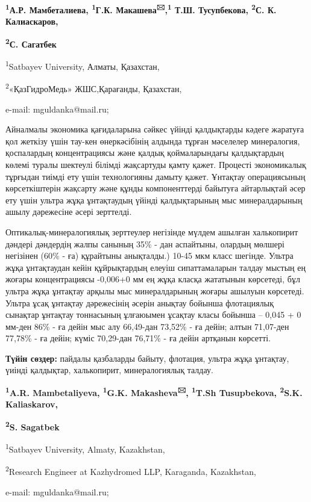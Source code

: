 
\begin{center}
{\bfseries \textsuperscript{1}А.Р. Мамбеталиева, \textsuperscript{1}Г.К.
Макашева\textsuperscript{🖂},\textsuperscript{1} Т.Ш. Тусупбекова,
\textsuperscript{2}С. К. Калиаскаров,}

{\bfseries \textsuperscript{2}С. Сагатбек}

\textsuperscript{1}Satbayev University, Алматы, Қазахстан,

\textsuperscript{2}«ҚазГидроМедь» ЖШС,Қарағанды, Қазахстан,

e-mail: mguldanka@mail.ru;
\end{center}

Айналмалы экономика қағидаларына сәйкес үйінді қалдықтарды кәдеге
жаратуға қол жеткізу үшін тау-кен өнеркәсібінің алдында тұрған мәселелер
минералогия, қоспалардың концентрациясы және қалдық қоймаларындағы
қалдықтардың көлемі туралы шектеулі білімді жақсартуды қамту қажет.
Процесті экономикалық тұрғыдан тиімді ету үшін технологияны дамыту
қажет. Ұнтақтау операциясының көрсеткіштерін жақсарту және құнды
компоненттерді байытуға айтарлықтай әсер ету үшін ультра жұқа
ұнтақтаудың үйінді қалдықтарының мыс минералдарының ашылу дәрежесіне
әсері зерттелді.

Оптикалық-минералогиялық зерттеулер негізінде мүлдем ашылған халькопирит
дәндері дәндердің жалпы санының 35\% - дан аспайтыны, олардың мөлшері
негізінен (60\% - ға) құрайтыны анықталды.) 10-45 мкм класс шегінде.
Ультра жұқа ұнтақтаудан кейін құйрықтардың елеуіш сипаттамаларын талдау
мыстың ең жоғары концентрациясы -0,006+0 мм ең жұқа класқа жататынын
көрсетеді, бұл ультра жұқа ұнтақтау арқылы мыс минералдарының жоғары
ашылуын көрсетеді. Ультра ұсақ ұнтақтау дәрежесінің әсерін анықтау
бойынша флотациялық сынақтар ұнтақтау тоннасының ұлғаюымен ұсақтау класы
бойынша -- 0,045 + 0 мм-ден 86\% - ға дейін мыс алу 66,49-дан 73,52\% -
ға дейін; алтын 71,07-ден 77,78\% - ға дейін; күміс 70,29-дан 76,71\% -
ға дейін артқанын көрсетті.

{\bfseries Түйін сөздер:} пайдалы қазбаларды байыту, флотация, ультра жұқа
ұнтақтау, үиінді қалдықтар, халькопирит, минералогиялық талдау.


\begin{center}
{\bfseries \textsuperscript{1}A.R. Mambetaliyeva, \textsuperscript{1}G.K.
Makasheva\textsuperscript{🖂}, \textsuperscript{1}T.Sh Tusupbekova,
\textsuperscript{2}S.K. Kaliaskarov,}

{\bfseries \textsuperscript{2}S. Sagatbek}

\textsuperscript{1}Satbayev University, Almaty, Kazakhstan,

\textsuperscript{2}Research Engineer at Kazhydromed LLP, Karaganda,
Kazakhstan,

e-mail: mguldanka@mail.ru;
\end{center}


